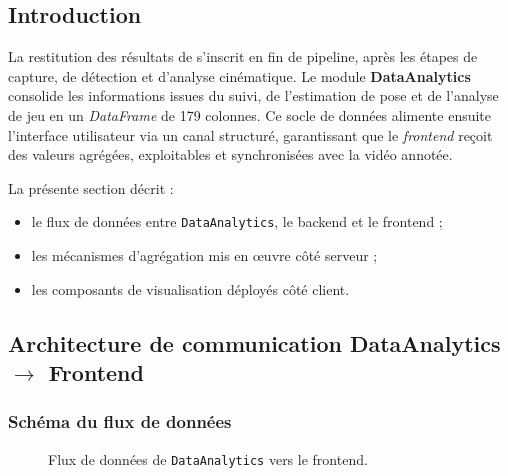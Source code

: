 \subsection{Introduction}

La restitution des résultats de \smartplayai{} s'inscrit en fin de pipeline, après
les étapes de capture, de détection et d'analyse cinématique. Le module
\textbf{DataAnalytics} consolide les informations issues du suivi, de l'estimation
de pose et de l'analyse de jeu en un \textit{DataFrame} de 179 colonnes. Ce socle de
données alimente ensuite l'interface utilisateur via un canal structuré, garantissant
que le \textit{frontend} reçoit des valeurs agrégées, exploitables et synchronisées
avec la vidéo annotée.

La présente section décrit :
\begin{itemize}
  \item le flux de données entre \texttt{DataAnalytics}, le backend et le frontend ;
  \item les mécanismes d'agrégation mis en œuvre côté serveur ;
  \item les composants de visualisation déployés côté client.
\end{itemize}

\subsection{Architecture de communication DataAnalytics $\rightarrow$ Frontend}

\subsubsection{Schéma du flux de données}

\begin{figure}[H]
\centering
{}
\caption{Flux de données de \texttt{DataAnalytics} vers le frontend.}
\label{fig:flux_frontend}
\end{figure}


